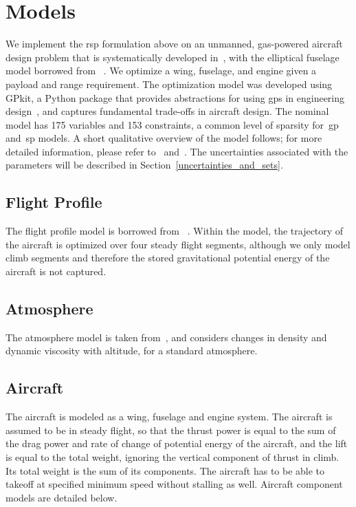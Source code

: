 \section{Models}

We implement the \gls{rsp} formulation above on an unmanned, gas-powered
aircraft design problem that is systematically developed in~\cite{Ozturk2018},
with the elliptical fuselage model borrowed from ~\cite{Burton2018}.
We optimize a wing, fuselage, and engine given a payload and range requirement.
The optimization model was developed using GPkit, a Python package that
provides abstractions for using \gls{gp}s in engineering design~\cite{gpkit}, and
captures fundamental trade-offs in aircraft design.
The nominal model has 175 variables and 153 constraints, a common level of
sparsity for~\gls{gp} and~\gls{sp} models.
A short qualitative overview of the model follows; for
more detailed information, please refer to~\cite{Burton2018} and~\cite{Ozturk2018}. The uncertainties
associated with the parameters will be described in Section~\ref{uncertainties_and_sets}.

\subsection{Flight Profile}

The flight profile model is borrowed from ~\cite{York2018}. Within the model, the
trajectory of the aircraft is optimized over four steady flight segments,
although we only model climb segments
and therefore the stored gravitational potential energy of the aircraft is not captured.

\subsection{Atmosphere}

The atmosphere model is taken from~\cite{Tao2018}, and considers changes in density and dynamic
viscosity with altitude, for a standard atmosphere.

\subsection{Aircraft}

The aircraft is modeled as a wing, fuselage and engine system. The aircraft is assumed
to be in steady flight, so that the thrust power is equal to the sum of the drag power and rate of change
of potential energy of the aircraft, and the lift is equal to the total weight, ignoring the vertical component of
thrust in climb. Its total weight is the sum of its components.
The aircraft has to be able to takeoff at specified minimum speed without stalling as well.
Aircraft component models are detailed below.

